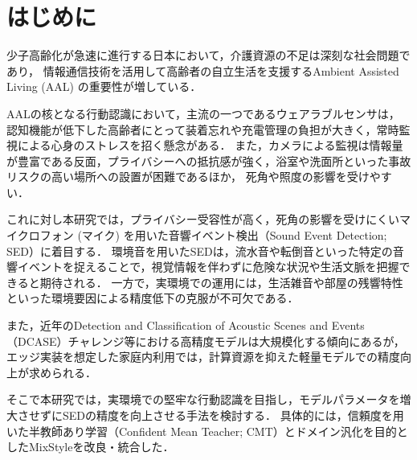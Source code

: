 \documentclass[main]{subfiles}
\begin{document}
\section{はじめに}
少子高齢化が急速に進行する日本において，介護資源の不足は深刻な社会問題であり，
情報通信技術を活用して高齢者の自立生活を支援するAmbient Assisted Living (AAL) の重要性が増している．

AALの核となる行動認識において，主流の一つであるウェアラブルセンサは，
認知機能が低下した高齢者にとって装着忘れや充電管理の負担が大きく，常時監視による心身のストレスを招く懸念がある．
また，カメラによる監視は情報量が豊富である反面，プライバシーへの抵抗感が強く，浴室や洗面所といった事故リスクの高い場所への設置が困難であるほか，
死角や照度の影響を受けやすい．\par

これに対し本研究では，プライバシー受容性が高く，死角の影響を受けにくいマイクロフォン (マイク) を用いた音響イベント検出（Sound Event Detection; SED）に着目する．
環境音を用いたSEDは，流水音や転倒音といった特定の音響イベントを捉えることで，視覚情報を伴わずに危険な状況や生活文脈を把握できると期待される．
一方で，実環境での運用には，生活雑音や部屋の残響特性といった環境要因による精度低下の克服が不可欠である．

また，近年のDetection and Classification of Acoustic Scenes and Events（DCASE）チャレンジ\cite{cornell2024dcase}等における高精度モデルは大規模化する傾向にあるが，
エッジ実装を想定した家庭内利用では，計算資源を抑えた軽量モデルでの精度向上が求められる．\par

そこで本研究では，実環境での堅牢な行動認識を目指し，モデルパラメータを増大させずにSEDの精度を向上させる手法を検討する．
具体的には，信頼度を用いた半教師あり学習（Confident Mean Teacher; CMT）とドメイン汎化を目的としたMixStyleを改良・統合した．
\end{document}
